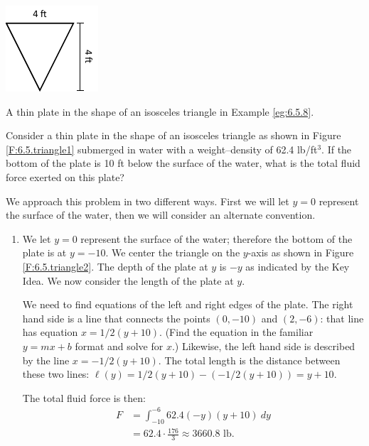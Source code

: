 \begin{marginfigure} %
\begin{center}
\includegraphics[scale=1.5]{figures/figfluid2a}
\end{center}
\caption{A thin plate in the shape of an isosceles triangle in Example \ref{eg:6.5.8}.} \label{F:6.5.triangle1}
\end{marginfigure}

\begin{example} \label{eg:6.5.8} %
Consider a thin plate in the shape of an isosceles triangle as shown in Figure \ref{F:6.5.triangle1} submerged in water with a weight--density of 62.4 lb/ft$^3$. If the bottom of the plate is 10 ft below the surface of the water, what is the total fluid force exerted on this plate?


\solution
We approach this problem in two different ways. First we will let $y=0$ represent the surface of the water, then we will consider an alternate convention.
	\begin{enumerate}
	\item		We let $y=0$ represent the surface of the water; therefore the bottom of the plate is at $y=-10$. We center the triangle on the $y$-axis as shown in Figure \ref{F:6.5.triangle2}. The depth of the plate at $y$ is $-y$ as indicated by the Key Idea. We now consider the length of the plate at $y$.
		
	We need to find equations of the left and right edges of the plate. The right hand side is a line that connects the points $(0,-10)$ and $(2,-6)$: that line has equation $x=1/2(y+10)$. (Find the equation in the familiar $y=mx+b$ format and solve for $x$.) Likewise, the left hand side is described by the line $x=-1/2(y+10)$. The total length is the distance between these two lines: $\ell(y)=1/2(y+10) - (-1/2(y+10)) = y+10.$
	
The total fluid force is then:
\begin{align*}
F 	&=	\int_{-10}^{-6} 62.4(-y)(y+10)\ dy \\
		&=	62.4\cdot \frac{176}{3} \approx	3660.8\text{ lb}.
\end{align*}


\end{enumerate}
\end{example}
